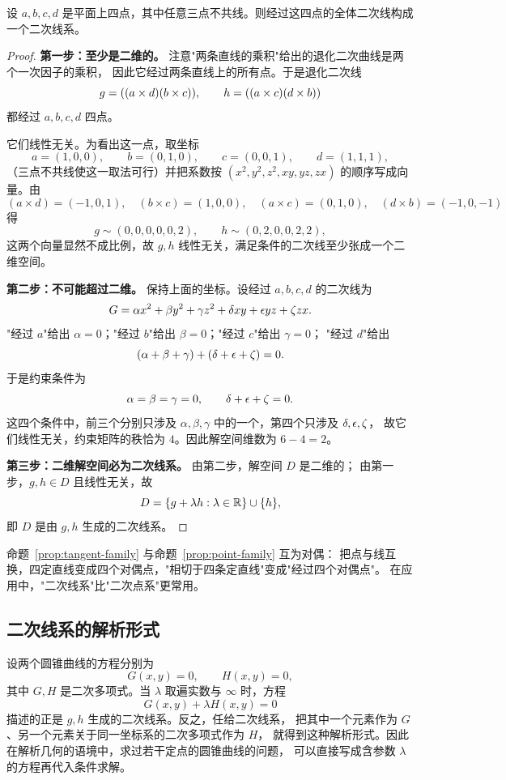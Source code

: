 \begin{proposition}[经过四个定点的二次线系]\label{prop:point-family}
设 $a,b,c,d$ 是平面上四点，其中任意三点不共线。则经过这四点的全体二次线构成一个二次线系。
\end{proposition}

\begin{proof}
\textbf{第一步：至少是二维的。} 注意"两条直线的乘积"给出的退化二次曲线是两个一次因子的乘积，
因此它经过两条直线上的所有点。于是退化二次线
\[
g=((a\times d)(b\times c)),\qquad
h=((a\times c)(d\times b))
\]
都经过 $a,b,c,d$ 四点。

它们线性无关。为看出这一点，取坐标
\[
a=(1,0,0),\qquad b=(0,1,0),\qquad c=(0,0,1),\qquad d=(1,1,1),
\]
（三点不共线使这一取法可行）并把系数按 $(x^2,y^2,z^2,xy,yz,zx)$ 的顺序写成向量。由
\[
(a\times d)=(-1,0,1),\quad (b\times c)=(1,0,0),\quad
(a\times c)=(0,1,0),\quad (d\times b)=(-1,0,-1)
\]
得
\[
g\sim(0,0,0,0,0,2),\qquad
h\sim(0,2,0,0,2,2),
\]
这两个向量显然不成比例，故 $g,h$ 线性无关，满足条件的二次线至少张成一个二维空间。

\textbf{第二步：不可能超过二维。} 保持上面的坐标。设经过 $a,b,c,d$ 的二次线为
\[
G=\alpha x^2+\beta y^2+\gamma z^2+\delta xy+\epsilon yz+\zeta zx .
\]
"经过 $a$"给出 $\alpha=0$；"经过 $b$"给出 $\beta=0$；"经过 $c$"给出 $\gamma=0$；
"经过 $d$"给出
\[
(\alpha+\beta+\gamma)+(\delta+\epsilon+\zeta)=0 .
\]
于是约束条件为
\[
\alpha=\beta=\gamma=0,\qquad \delta+\epsilon+\zeta=0 .
\]
这四个条件中，前三个分别只涉及 $\alpha,\beta,\gamma$ 中的一个，第四个只涉及 $\delta,\epsilon,\zeta$，
故它们线性无关，约束矩阵的秩恰为 $4$。因此解空间维数为 $6-4=2$。

\textbf{第三步：二维解空间必为二次线系。} 由第二步，解空间 $D$ 是二维的；
由第一步，$g,h\in D$ 且线性无关，故
\[
D=\{g+\lambda h:\lambda\in\mathbb{R}\}\cup\{h\},
\]
即 $D$ 是由 $g,h$ 生成的二次线系。
\end{proof}

\begin{remark}
命题~\ref{prop:tangent-family} 与命题~\ref{prop:point-family} 互为对偶：
把点与线互换，四定直线变成四个对偶点，"相切于四条定直线"变成"经过四个对偶点"。
在应用中，"二次线系"比"二次点系"更常用。
\end{remark}

\subsection{二次线系的解析形式}

设两个圆锥曲线的方程分别为
\[
G(x,y)=0,\qquad H(x,y)=0 ,
\]
其中 $G,H$ 是二次多项式。当 $\lambda$ 取遍实数与 $\infty$ 时，方程
\[
G(x,y)+\lambda H(x,y)=0
\]
描述的正是 $g,h$ 生成的二次线系。反之，任给二次线系，
把其中一个元素作为 $G$、另一个元素关于同一坐标系的二次多项式作为 $H$，
就得到这种解析形式。因此在解析几何的语境中，求过若干定点的圆锥曲线的问题，
可以直接写成含参数 $\lambda$ 的方程再代入条件求解。

